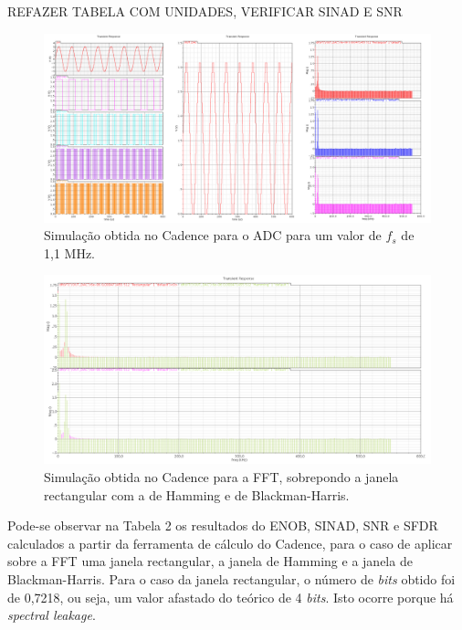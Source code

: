 \documentclass[11pt]{article}
\numberwithin{equation}{section}
\begin{document}
REFAZER TABELA COM UNIDADES, VERIFICAR SINAD E SNR

\begin{figure}[H]
	\centering
	\includegraphics[keepaspectratio=true, scale=0.27]{lab/f_11M.png}
	\caption{Simulação obtida no Cadence para o ADC para um valor de $f_{s}$ de 1,1 MHz.}
	\vspace{-0.8em}
\end{figure}

\begin{figure}[H]
	\centering
	\includegraphics[keepaspectratio=true, scale=0.33]{lab/f_fft_11M.png}
	\caption{Simulação obtida no Cadence para a FFT, sobrepondo a janela rectangular com a de Hamming e de Blackman-Harris.}
	\vspace{-0.8em}
\end{figure}

Pode-se observar na Tabela 2 os resultados do ENOB, SINAD, SNR e SFDR calculados a partir da ferramenta de cálculo do Cadence, para o caso de aplicar sobre a FFT uma janela rectangular, a janela de Hamming e a janela de Blackman-Harris. Para o caso da janela rectangular, o número de \textit{bits} obtido foi de 0,7218, ou seja, um valor afastado do teórico de 4 \textit{bits}. Isto ocorre porque há \textit{spectral leakage}. 
\end{document}
